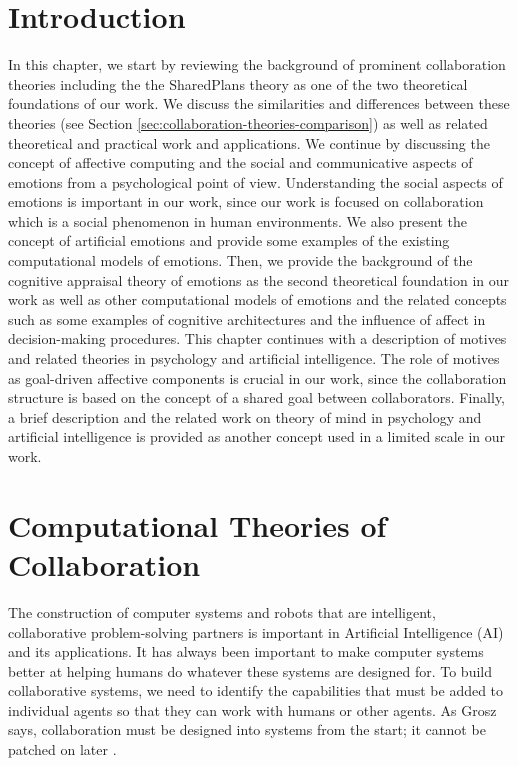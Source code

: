 \documentclass[12pt]{report}
\begin{document}
\section{Introduction}
\vspace*{-3mm}
In this chapter, we start by reviewing the background of prominent collaboration
theories including the the SharedPlans theory \cite{grosz:plans-discourse} as
one of the two theoretical foundations of our work. We discuss the similarities
and differences between these theories (see Section
\ref{sec:collaboration-theories-comparison}) as well as related theoretical and
practical work and applications. We continue by discussing the concept of
affective computing and the social and communicative aspects of emotions from a
psychological point of view. Understanding the social aspects of emotions is
important in our work, since our work is focused on collaboration which is a
social phenomenon in human environments. We also present the concept of
artificial emotions and provide some examples of the existing computational
models of emotions. Then, we provide the background of the cognitive appraisal
theory of emotions as the second theoretical foundation in our work as well as
other computational models of emotions and the related concepts such as some
examples of cognitive architectures and the influence of affect in
decision-making procedures. This chapter continues with a description of motives
and related theories in psychology and artificial intelligence. The role of
motives as goal-driven affective components is crucial in our work, since the
collaboration structure is based on the concept of a shared goal between
collaborators. Finally, a brief description and the related work on theory of
mind in psychology and artificial intelligence is provided as another concept
used in a limited scale in our work.

\section{Computational Theories of Collaboration}
The construction of computer systems and robots that are intelligent,
collaborative problem-solving partners is important in Artificial Intelligence
(AI) and its applications. It has always been important to make computer systems
better at helping humans do whatever these systems are designed for. To build
collaborative systems, we need to identify the capabilities that must be added
to individual agents so that they can work with humans or other agents. As Grosz
says, collaboration must be designed into systems from the start; it cannot be
patched on later \cite{grosz:collaborative-systems}.
\end{document}
